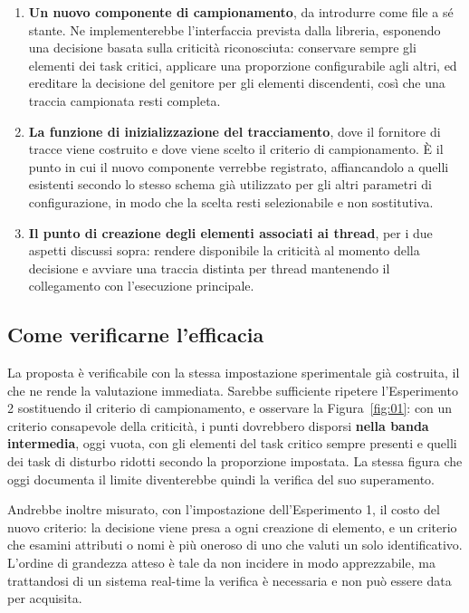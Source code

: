 \documentclass[11pt,a4paper]{article}
\begin{document}
\begin{enumerate}
\item \textbf{Un nuovo componente di campionamento}, da introdurre come file a s\'e stante. Ne
implementerebbe l'interfaccia prevista dalla libreria, esponendo una decisione basata sulla
criticit\`a riconosciuta: conservare sempre gli elementi dei task critici, applicare una
proporzione configurabile agli altri, ed ereditare la decisione del genitore per gli elementi
discendenti, cos\`i che una traccia campionata resti completa.

\item \textbf{La funzione di inizializzazione del tracciamento}, dove il fornitore di tracce viene
costruito e dove viene scelto il criterio di campionamento. \`E il punto in cui il nuovo componente
verrebbe registrato, affiancandolo a quelli esistenti secondo lo stesso schema gi\`a utilizzato per
gli altri parametri di configurazione, in modo che la scelta resti selezionabile e non sostitutiva.

\item \textbf{Il punto di creazione degli elementi associati ai thread}, per i due aspetti discussi
sopra: rendere disponibile la criticit\`a al momento della decisione e avviare una traccia distinta
per thread mantenendo il collegamento con l'esecuzione principale.
\end{enumerate}

\subsection{Come verificarne l'efficacia}

La proposta \`e verificabile con la stessa impostazione sperimentale gi\`a costruita, il che ne
rende la valutazione immediata. Sarebbe sufficiente ripetere l'Esperimento 2 sostituendo il criterio
di campionamento, e osservare la Figura~\ref{fig:01}: con un criterio consapevole della criticit\`a,
i punti dovrebbero disporsi \textbf{nella banda intermedia}, oggi vuota, con gli elementi del task
critico sempre presenti e quelli dei task di disturbo ridotti secondo la proporzione impostata.
La stessa figura che oggi documenta il limite diventerebbe quindi la verifica del suo superamento.

Andrebbe inoltre misurato, con l'impostazione dell'Esperimento 1, il costo del nuovo criterio: la
decisione viene presa a ogni creazione di elemento, e un criterio che esamini attributi o nomi \`e
pi\`u oneroso di uno che valuti un solo identificativo. L'ordine di grandezza atteso \`e tale da non
incidere in modo apprezzabile, ma trattandosi di un sistema real-time la verifica \`e necessaria e
non pu\`o essere data per acquisita.
\end{document}
